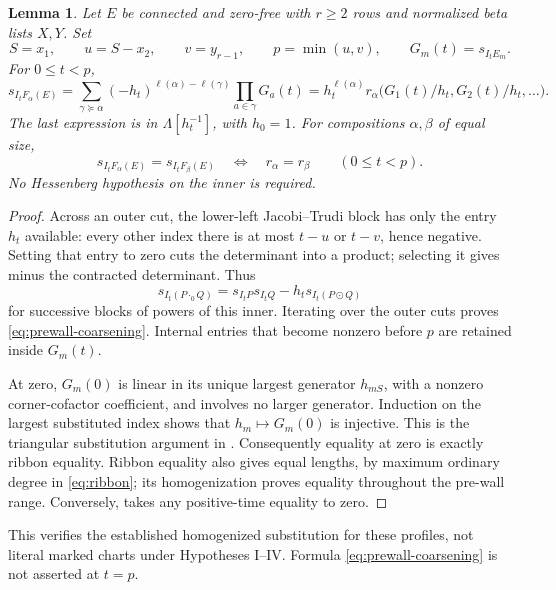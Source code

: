 \documentclass[11pt,a4paper]{amsart}
\numberwithin{equation}{section}
\theoremstyle{plain}
\newtheorem{lemma}[theorem]{Lemma}
\theoremstyle{definition}
\begin{document}
\begin{lemma}\label{lem:prewall}
Let \(E\) be connected and zero-free with \(r\ge2\) rows and
normalized beta lists \(X,Y\).  Set
\[
 S=x_1,\qquad u=S-x_2,\qquad v=y_{r-1},\qquad p=\min(u,v),
 \qquad G_m(t)=s_{I_tE_m}.
\]
For \(0\le t<p\),
\begin{equation}\label{eq:prewall-coarsening}
 s_{I_tF_\alpha(E)}=
 \sum_{\gamma\succeq\alpha}(-h_t)^{\ell(\alpha)-\ell(\gamma)}
                 \prod_{a\in\gamma}G_a(t)
 =h_t^{\ell(\alpha)}
 r_\alpha\bigl(G_1(t)/h_t,G_2(t)/h_t,\ldots\bigr).
\end{equation}
The last expression is in \(\Lambda[h_t^{-1}]\), with \(h_0=1\).
For compositions \(\alpha,\beta\) of equal size,
\begin{equation}\label{eq:prewall-equality}
 s_{I_tF_\alpha(E)}=s_{I_tF_\beta(E)}
 \quad\Longleftrightarrow\quad r_\alpha=r_\beta
 \qquad(0\le t<p).
\end{equation}
No Hessenberg hypothesis on the inner is required.
\end{lemma}

\begin{proof}
Across an outer cut, the lower-left Jacobi--Trudi block has only the
entry \(h_t\) available: every other index there is at most
\(t-u\) or \(t-v\), hence negative.  Setting that entry to zero
cuts the determinant into a product; selecting it gives minus the
contracted determinant.  Thus
\[
 s_{I_t(P\cdot_0Q)}=s_{I_tP}s_{I_tQ}-h_t s_{I_t(P\odot Q)}
\]
for successive blocks of powers of this inner.  Iterating over the outer
cuts proves \eqref{eq:prewall-coarsening}.  Internal entries that become
nonzero before \(p\) are retained inside \(G_m(t)\).

At zero, \(G_m(0)\) is linear in its unique largest generator
\(h_{mS}\), with a nonzero corner-cofactor coefficient, and involves
no larger generator.  Induction on the largest substituted index shows
that \(h_m\mapsto G_m(0)\) is injective.  This is the triangular
substitution argument in \cite{Shields2026Inflation}.
Consequently equality at zero is exactly ribbon equality.  Ribbon equality
also gives equal lengths, by maximum ordinary degree in
\eqref{eq:ribbon}; its homogenization proves equality throughout the
pre-wall range.  Conversely,  takes any positive-time
equality to zero.
\end{proof}

This verifies the established homogenized substitution for these profiles,
not literal marked charts under Hypotheses I--IV.  Formula
\eqref{eq:prewall-coarsening} is not asserted at \(t=p\).
\end{document}

